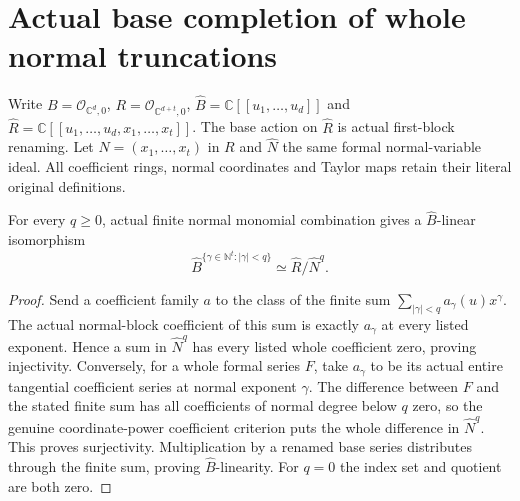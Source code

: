 \section{Actual base completion of whole normal truncations}

Write $B=\mathcal O_{\mathbb C^d,0}$, $R=\mathcal O_{\mathbb C^{d+t},0}$,
$\widehat B=\mathbb C[[u_1,\ldots,u_d]]$ and
$\widehat R=\mathbb C[[u_1,\ldots,u_d,x_1,\ldots,x_t]]$.
The base action on $\widehat R$ is actual first-block renaming.
Let $N=(x_1,\ldots,x_t)$ in $R$ and $\widehat N$ the same formal
normal-variable ideal. All coefficient rings, normal coordinates and
Taylor maps retain their literal original definitions.

\begin{theorem}
\label{hir:actual-formal-normal-truncation-coordinates}
\leanok
{}
For every $q\geq0$, actual finite normal monomial combination gives a
$\widehat B$-linear isomorphism
\[
 \widehat B^{\{\gamma\in\mathbb N^t:\lvert\gamma\rvert<q\}}
 \simeq\widehat R/\widehat N^q.
\]
\end{theorem}
\begin{proof}
Send a coefficient family $a$ to the class of the finite sum
$\sum_{\lvert\gamma\rvert<q}a_\gamma(u)x^\gamma$. The actual
normal-block coefficient of this sum is exactly $a_\gamma$ at every
listed exponent. Hence a sum in $\widehat N^q$ has every listed whole
coefficient zero, proving injectivity. Conversely, for a whole formal
series $F$, take $a_\gamma$ to be its actual entire tangential coefficient
series at normal exponent $\gamma$. The difference between $F$ and the
stated finite sum has all coefficients of normal degree below $q$ zero,
so the genuine coordinate-power coefficient criterion puts the whole
difference in $\widehat N^q$. This proves surjectivity. Multiplication
by a renamed base series distributes through the finite sum, proving
$\widehat B$-linearity. For $q=0$ the index set and quotient are both zero.
\end{proof}

